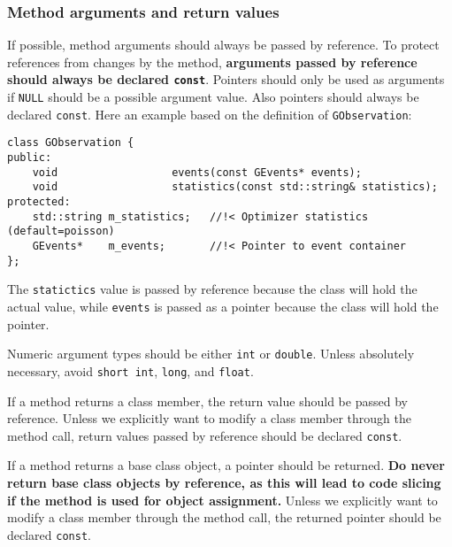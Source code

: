 \documentclass{article}[12pt,a4]
\begin{document}
\subsubsection{Method arguments and return values}


If possible, method arguments should always be passed by reference.
To protect references from changes by the method, {\bf arguments passed by reference
should always be declared {\tt const}}.
Pointers should only be used as arguments if {\tt NULL} should be a possible
argument value.
Also pointers should always be declared {\tt const}.
Here an example based on the definition of {\tt GObservation}:
\begin{verbatim}
class GObservation {
public:
    void                  events(const GEvents* events);
    void                  statistics(const std::string& statistics);
protected:
    std::string m_statistics;   //!< Optimizer statistics (default=poisson)
    GEvents*    m_events;       //!< Pointer to event container
};
\end{verbatim}
The {\tt statictics} value is passed by reference because the class will hold the actual
value, while {\tt events} is passed as a pointer because the class will hold the
pointer.

Numeric argument types should be either {\tt int} or {\tt double}.
Unless absolutely necessary, avoid {\tt short int}, {\tt long}, and {\tt float}.

If a method returns a class member, the return value should be passed by reference.
Unless we explicitly want to modify a class member through the method call,
return values passed by reference should be declared {\tt const}.

If a method returns a base class object, a pointer should be returned.
{\bf Do never return base class objects by reference, as this will lead to
code slicing if the method is used for object assignment.}
Unless we explicitly want to modify a class member through the method call,
the returned pointer should be declared {\tt const}.
\end{document}

